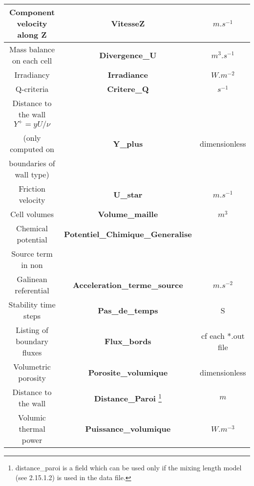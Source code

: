 \begin{longtable}[hcr]{|c|c|c|}
Component velocity along Z                      & \textbf{VitesseZ}                         & $m.s^{-1}$ \\ \hline
Mass balance on each cell                       & \textbf{Divergence\_U}                    & $m^3.s^{-1}$  \\ \hline
Irradiancy                                      & \textbf{Irradiance}                       & $W.m^{-2}$ \\ \hline
Q-criteria                                      & \textbf{Critere\_Q}                       & $s^{-1}$ \\ \hline
Distance to the wall $Y^+=yU/\nu$               &                                           & \\ 
(only computed on                               & \textbf{Y\_plus}                          & dimensionless \\ 
boundaries of wall type)                        &                                           &  \\ \hline
Friction velocity                               & \textbf{U\_star}                          & $m.s^{-1}$ \\ \hline
Cell volumes                                    & \textbf{Volume\_maille}                   & $m^3$ \\ \hline
Chemical potential                              & \textbf{Potentiel\_Chimique\_Generalise}  & \\ \hline
Source term in non                              &                                           & \\
Galinean referential                            & \textbf{Acceleration\_terme\_source}      & $m.s^{-2}$ \\ \hline
Stability time steps                            & \textbf{Pas\_de\_temps}                   & S \\ \hline
Listing of boundary fluxes                      & \textbf{Flux\_bords}                      & cf each *.out file \\ \hline
Volumetric porosity                             & \textbf{Porosite\_volumique}              & dimensionless \\ \hline
Distance to the wall                            & \textbf{Distance\_Paroi} \footnote{distance\_paroi is a field which can be used only if the mixing length model (see 2.15.1.2) is used in the data file.}              & $m$\\ \hline
Volumic thermal power                           & \textbf{Puissance\_volumique}             & $W.m^{-3}$ \\ \hline

\end{longtable}
